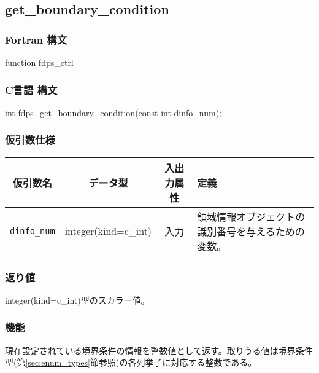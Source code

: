\clearpage

\subsection{get\_boundary\_condition}
\subsubsection*{Fortran 構文}
\begin{screen}
\begin{spverbatim}
function fdps_ctrl%
\end{spverbatim}
\end{screen}

\subsubsection*{C言語 構文}
\begin{screen}
\begin{spverbatim}
int fdps_get_boundary_condition(const int dinfo_num);
\end{spverbatim}
\end{screen}

\subsubsection*{仮引数仕様}
\begin{table}[h]
\begin{tabularx}{\linewidth}{cccX}
\toprule
\rowcolor{Snow2}
仮引数名 & データ型 & 入出力属性 & 定義 \\
\midrule
\texttt{dinfo\_num} & integer(kind=c\_int) & 入力 & 領域情報オブジェクトの識別番号を与えるための変数。\\
\bottomrule
\end{tabularx}
\end{table}

\subsubsection*{返り値}
integer(kind=c\_int)型のスカラー値。

\subsubsection*{機能}
現在設定されている境界条件の情報を整数値として返す。取りうる値は境界条件型(第\ref{sec:enum_types}節参照)の各列挙子に対応する整数である。

